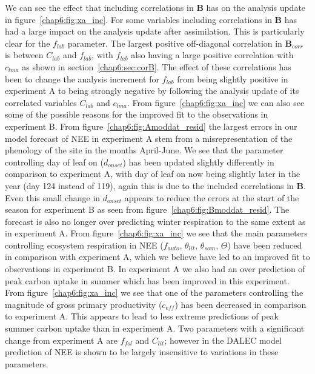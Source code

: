 We can see the effect that including correlations in $\textbf{B}$ has on the analysis update in figure~\ref{chap6:fig:xa_inc}. For some variables including correlations in $\textbf{B}$ has had a large impact on the analysis update after assimilation. This is particularly clear for the $f_{lab}$ parameter. The largest positive off-diagonal correlation in $\textbf{B}_{corr}$ is between $C_{lab}$ and $f_{lab}$, with $f_{lab}$ also having a large positive correlation with $c_{lma}$ as shown in section~\ref{chap6:sec:corB}. The effect of these correlations has been to change the analysis increment for $f_{lab}$ from being slightly positive in experiment A to being strongly negative by following the analysis update of its correlated variables $C_{lab}$ and $c_{lma}$. From figure~\ref{chap6:fig:xa_inc} we can also see some of the possible reasons for the improved fit to the observations in experiment B. From figure~\ref{chap6:fig:Amoddat_resid} the largest errors in our model forecast of NEE in experiment A stem from a misrepresentation of the phenology of the site in the months April-June. We see that the parameter controlling day of leaf on ($d_{onset}$) has been updated slightly differently in comparison to experiment A, with day of leaf on now being slightly later in the year (day 124 instead of 119), again this is due to the included correlations in $\textbf{B}$. Even this small change in $d_{onset}$ appears to reduce the errors at the start of the season for experiment B as seen from figure~\ref{chap6:fig:Bmoddat_resid}. The forecast is also no longer over predicting winter respiration to the same extent as in experiment A. From figure~\ref{chap6:fig:xa_inc} we see that the main parameters controlling ecosystem respiration in NEE ($f_{auto}$, $\theta_{lit}$, $\theta_{som}$, $\Theta$) have been reduced in comparison with experiment A, which we believe have led to an improved fit to observations in experiment B. In experiment A we also had an over prediction of peak carbon uptake in summer which has been improved in this experiment. From figure~\ref{chap6:fig:xa_inc} we see that one of the parameters controlling the magnitude of gross primary productivity ($c_{eff}$) has been decreased in comparison to experiment A. This appears to lead to less extreme predictions of peak summer carbon uptake than in experiment A. Two parameters with a significant change from experiment A are $f_{fol}$ and $C_{lit}$; however in \citet{Ann2013} the DALEC model prediction of NEE is shown to be largely insensitive to variations in these parameters.

